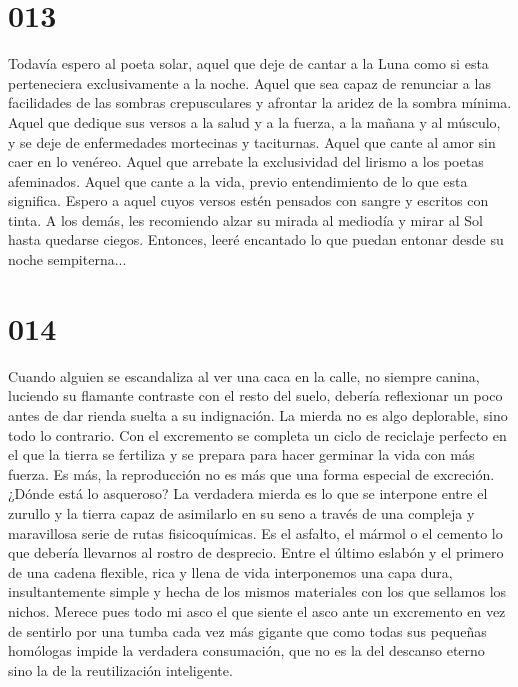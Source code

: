 \documentclass[a4paper,11pt,openright,twocolumn]{book}
\begin{document}
\section*{013}

Todavía espero al poeta solar, aquel que deje de cantar a la Luna como si esta perteneciera exclusivamente a la noche. Aquel que sea capaz de renunciar a las facilidades de las sombras crepusculares y afrontar la aridez de la sombra mínima. Aquel que dedique sus versos a la salud y a la fuerza, a la mañana y al músculo, y se deje de enfermedades mortecinas y taciturnas. Aquel que cante al amor sin caer en lo venéreo. Aquel que arrebate la exclusividad del lirismo a los poetas afeminados. Aquel que cante a la vida, previo entendimiento de lo que esta significa. Espero a aquel cuyos versos estén pensados con sangre y escritos con tinta. A los demás, les recomiendo alzar su mirada al mediodía y mirar al Sol hasta quedarse ciegos. Entonces, leeré encantado lo que puedan entonar desde su noche sempiterna...

\section*{014}

Cuando alguien se escandaliza al ver una caca en la calle, no siempre canina, luciendo su flamante contraste con el resto del suelo, debería reflexionar un poco antes de dar rienda suelta a su indignación. La mierda no es algo deplorable, sino todo lo contrario. Con el excremento se completa un ciclo de reciclaje perfecto en el que la tierra se fertiliza y se prepara para hacer germinar la vida con más fuerza. Es más, la reproducción no es más que una forma especial de excreción. ¿Dónde está lo asqueroso? La verdadera mierda es lo que se interpone entre el zurullo y la tierra capaz de asimilarlo en su seno a través de una compleja y maravillosa serie de rutas fisicoquímicas. Es el asfalto, el mármol o el cemento lo que debería llevarnos al rostro de desprecio. Entre el último eslabón y el primero de una cadena flexible, rica y llena de vida interponemos una capa dura, insultantemente simple y hecha de los mismos materiales con los que sellamos los nichos. Merece pues todo mi asco el que siente el asco ante un excremento en vez de sentirlo por una tumba cada vez más gigante que como todas sus pequeñas homólogas impide la verdadera consumación, que no es la del descanso eterno sino la de la reutilización inteligente.
\end{document}
